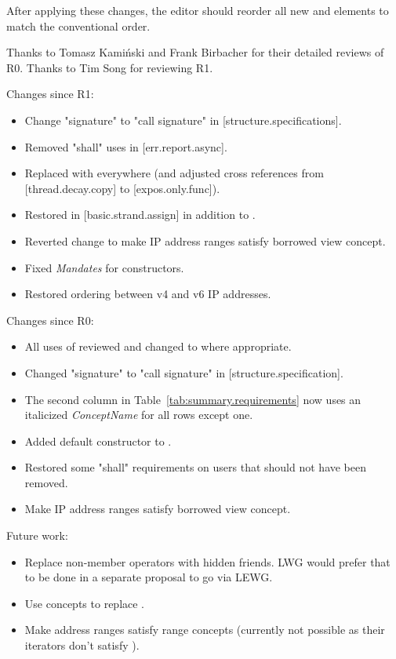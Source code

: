 After applying these changes, the editor should reorder all new
\constraints and \mandates elements to match the conventional order.

\vspace{2.5cm}

Thanks to Tomasz Kamiński and Frank Birbacher for their detailed reviews of R0.
Thanks to Tim Song for reviewing R1.

Changes since R1:
\begin{itemize}
\item Change "signature" to "call signature" in [structure.specifications].
\item Removed "shall" uses in [err.report.async].
\item Replaced  with  everywhere
  (and adjusted cross references from [thread.decay.copy] to [expos.only.func]).
\item Restored \expects in [basic.strand.assign] in addition to \constraints{}.
\item Reverted change to make IP address ranges satisfy borrowed view concept.
\item Fixed \textit{Mandates} for  constructors.
\item Restored ordering between v4 and v6 IP addresses.
\end{itemize}

Changes since R0:
\begin{itemize}
\item All uses of  reviewed and changed to
   where appropriate.
\item Changed "signature" to "call signature" in [structure.specification].
\item The second column in Table~\ref{tab:summary.requirements} now uses
  an italicized \textit{ConceptName} for all rows except one.
\item Added  default constructor to .
\item Restored some "shall" requirements on users that should not have been removed.
\item Make IP address ranges satisfy borrowed view concept.
\end{itemize}

Future work:

\begin{itemize}
\item
Replace non-member operators with hidden friends.
LWG would prefer that to be done in a separate proposal to go via LEWG.
\item
Use concepts to replace .
\item
Make address ranges satisfy range concepts (currently not possible as
their iterators don't satisfy ).
\end{itemize}




